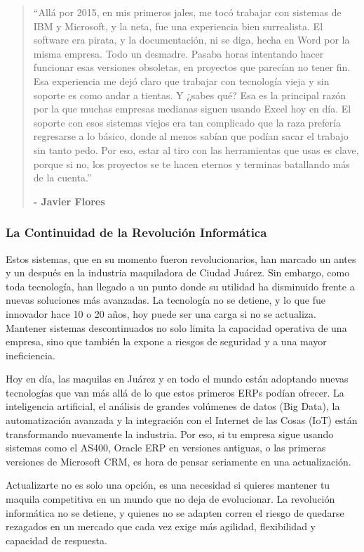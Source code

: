 \documentclass[
  10pt,
  letterpaper,
]{book}
\begin{document}
\begin{quote}
``Allá por 2015, en mis primeros jales, me tocó trabajar con sistemas de
IBM y Microsoft, y la neta, fue una experiencia bien surrealista. El
software era pirata, y la documentación, ni se diga, hecha en Word por
la misma empresa. Todo un desmadre. Pasaba horas intentando hacer
funcionar esas versiones obsoletas, en proyectos que parecían no tener
fin. Esa experiencia me dejó claro que trabajar con tecnología vieja y
sin soporte es como andar a tientas. Y ¿sabes qué? Esa es la principal
razón por la que muchas empresas medianas siguen usando Excel hoy en
día. El soporte con esos sistemas viejos era tan complicado que la raza
prefería regresarse a lo básico, donde al menos sabían que podían sacar
el trabajo sin tanto pedo. Por eso, estar al tiro con las herramientas
que usas es clave, porque si no, los proyectos se te hacen eternos y
terminas batallando más de la cuenta.''

\textbf{- Javier Flores}
\end{quote}

\subsubsection{La Continuidad de la Revolución
Informática}\label{la-continuidad-de-la-revoluciuxf3n-informuxe1tica}

Estos sistemas, que en su momento fueron revolucionarios, han marcado un
antes y un después en la industria maquiladora de Ciudad Juárez. Sin
embargo, como toda tecnología, han llegado a un punto donde su utilidad
ha disminuido frente a nuevas soluciones más avanzadas. La tecnología no
se detiene, y lo que fue innovador hace 10 o 20 años, hoy puede ser una
carga si no se actualiza. Mantener sistemas descontinuados no solo
limita la capacidad operativa de una empresa, sino que también la expone
a riesgos de seguridad y a una mayor ineficiencia.

Hoy en día, las maquilas en Juárez y en todo el mundo están adoptando
nuevas tecnologías que van más allá de lo que estos primeros ERPs podían
ofrecer. La inteligencia artificial, el análisis de grandes volúmenes de
datos (Big Data), la automatización avanzada y la integración con el
Internet de las Cosas (IoT) están transformando nuevamente la industria.
Por eso, si tu empresa sigue usando sistemas como el AS400, Oracle ERP
en versiones antiguas, o las primeras versiones de Microsoft CRM, es
hora de pensar seriamente en una actualización.

Actualizarte no es solo una opción, es una necesidad si quieres mantener
tu maquila competitiva en un mundo que no deja de evolucionar. La
revolución informática no se detiene, y quienes no se adapten corren el
riesgo de quedarse rezagados en un mercado que cada vez exige más
agilidad, flexibilidad y capacidad de respuesta.
\end{document}
